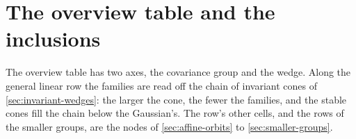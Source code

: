 
\section{The overview table and the inclusions}
\label{sec:landscape-table}

The overview table has two axes, the covariance group and the wedge. Along the general linear row
the families are read off the chain of invariant cones of
\ref{sec:invariant-wedges}: the larger the cone, the fewer the families, and the stable cones fill the
chain below the Gaussian's. The row's other cells, and the rows of the smaller groups, are the nodes of
\ref{sec:affine-orbits} to \ref{sec:smaller-groups}.

